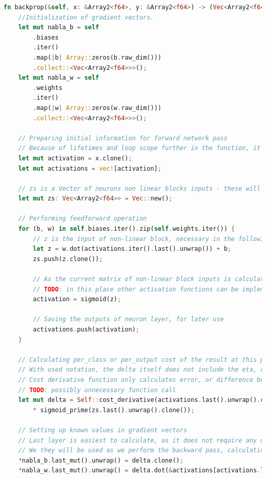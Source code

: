 \documentclass[12pt,twoside]{article}
\begin{document}
\begin{lstlisting}[language=Rust,caption=Realizacja funkcji wstecznej propagacji błędu,label={lst:backprop}]
fn backprop(&self, x: &Array2<f64>, y: &Array2<f64>) -> (Vec<Array2<f64>>, Vec<Array2<f64>>) {
	//Initialization of gradient vectors.
	let mut nabla_b = self
		.biases
		.iter()
		.map(|b| Array::zeros(b.raw_dim()))
		.collect::<Vec<Array2<f64>>>();
	let mut nabla_w = self
		.weights
		.iter()
		.map(|w| Array::zeros(w.raw_dim()))
		.collect::<Vec<Array2<f64>>>();

	// Preparing initial information for forward network pass
	// Because of lifetimes and loop scope further in the function, it is best to make copies of input matrix here
	let mut activation = x.clone();
	let mut activations = vec![activation];

	// zs is a Vector of neurons non linear blocks inputs - these will be calculated in the following loop
	let mut zs: Vec<Array2<f64>> = Vec::new();

	// Performing feedforward operation
	for (b, w) in self.biases.iter().zip(self.weights.iter()) {
		// z is the input of non-linear block, necessary in the following gradient calculation
		let z = w.dot(activations.iter().last().unwrap()) + b;
		zs.push(z.clone());

		// As the current matrix of non-linear block inputs is calculated, it is passed as argument to the activation function
		// TODO: in this place other activation functions can be implemented
		activation = sigmoid(z);

		// Saving the outputs of neuron layer, for later use
		activations.push(activation);
	}

	// Calculating per_class or per_output cost of the result at this point, it is also worth noting that the "delta" is only partially calculated
	// With used notation, the delta itself does not include the eta, or learning rate
	// Cost derivative function only calculates error, or difference between achieved and expected output
	// TODO: possibly unnecessary function call
	let mut delta = Self::cost_derivative(activations.last().unwrap().clone(), y.clone())
		* sigmoid_prime(zs.last().unwrap().clone());

	// Setting up known values in gradient vectors
	// Last layer is easiest to calculate, as it does not require any data not available at the moment
	// We they will be used as we perform the backward pass, calculating bias and weight gradients for every layer
	*nabla_b.last_mut().unwrap() = delta.clone();
	*nabla_w.last_mut().unwrap() = delta.dot(&activations[activations.len() - 2].t());


\end{lstlisting}
\end{document}
